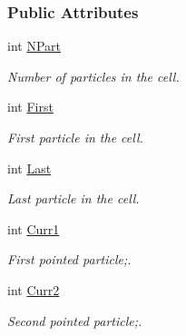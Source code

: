 \subsubsection*{Public Attributes}
\begin{DoxyCompactItemize}
\item 
int \hyperlink{classDomCell_abdcc792391d8c5092471dff191de47f4}{N\+Part}\hypertarget{classDomCell_abdcc792391d8c5092471dff191de47f4}{}\label{classDomCell_abdcc792391d8c5092471dff191de47f4}

\begin{DoxyCompactList}\small\item\em Number of particles in the cell. \end{DoxyCompactList}\item 
int \hyperlink{classDomCell_a10a3fcd824154f6545a843a16ebf7abb}{First}\hypertarget{classDomCell_a10a3fcd824154f6545a843a16ebf7abb}{}\label{classDomCell_a10a3fcd824154f6545a843a16ebf7abb}

\begin{DoxyCompactList}\small\item\em First particle in the cell. \end{DoxyCompactList}\item 
int \hyperlink{classDomCell_a341cc2f3f0987c9467af85d3a7fe3754}{Last}\hypertarget{classDomCell_a341cc2f3f0987c9467af85d3a7fe3754}{}\label{classDomCell_a341cc2f3f0987c9467af85d3a7fe3754}

\begin{DoxyCompactList}\small\item\em Last particle in the cell. \end{DoxyCompactList}\item 
int \hyperlink{classDomCell_a8a6d3113506e7d669ba829887c058f22}{Curr1}\hypertarget{classDomCell_a8a6d3113506e7d669ba829887c058f22}{}\label{classDomCell_a8a6d3113506e7d669ba829887c058f22}

\begin{DoxyCompactList}\small\item\em First pointed particle;. \end{DoxyCompactList}\item 
int \hyperlink{classDomCell_a46862a195fa643b47b3dddb3dbc05d42}{Curr2}\hypertarget{classDomCell_a46862a195fa643b47b3dddb3dbc05d42}{}\label{classDomCell_a46862a195fa643b47b3dddb3dbc05d42}

\begin{DoxyCompactList}\small\item\em Second pointed particle;. \end{DoxyCompactList}\end{DoxyCompactItemize}
